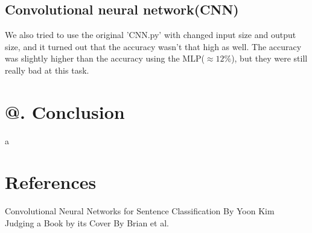 \documentclass[jou,apacite, 10px]{apa6}
\makeatletter
\newcommand*{\rom}[1]{\expandafter\@slowromancap\romannumeral #1@}
\makeatother
\begin{document}
\subsection {Convolutional neural network(CNN)}
We also tried to use the original 'CNN.py' with changed input size and output size, and it turned out that the accuracy wasn't that high as well. The accuracy was slightly higher than the accuracy using the MLP($\approx 12\%$), but they were still really bad at this task.


\section{\rom{6}. Conclusion}
a
\section{References}
\noindent Convolutional Neural Networks for Sentence Classification By Yoon Kim\\
Judging a Book by its Cover By Brian et al.
\end{document}
